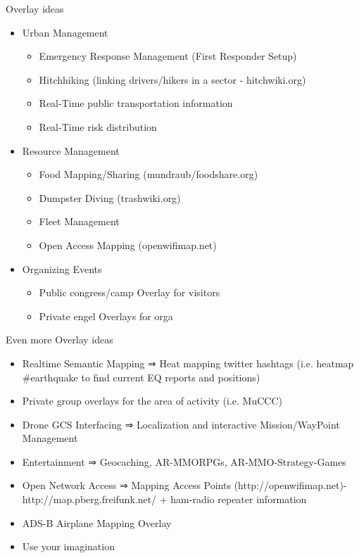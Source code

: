 \documentclass{beamer}
\begin{document}
\begin{frame}{Overlay ideas}{}
 \begin{itemize}
  \item Urban Management
   \begin{itemize}
    \item Emergency Response Management (First Responder Setup)
    \item Hitchhiking (linking drivers/hikers in a sector - hitchwiki.org)
    \item Real-Time public transportation information
    \item Real-Time risk distribution
   \end{itemize}
  \item Resource Management
   \begin{itemize}
    \item Food Mapping/Sharing (mundraub/foodshare.org)
    \item Dumpster Diving (trashwiki.org)
    \item Fleet Management
    \item Open Access Mapping (openwifimap.net)
   \end{itemize}
  \item Organizing Events
   \begin{itemize}
    \item Public congress/camp Overlay for visitors
    \item Private engel Overlays for orga
   \end{itemize}

 \end{itemize}
\end{frame}

\begin{frame}{Even more Overlay ideas}{}
 \vspace{1em}
 \begin{itemize}
  \item Realtime Semantic Mapping ⇒ Heat mapping twitter hashtags (i.e. heatmap \#earthquake to find current EQ reports and positions)
  \item Private group overlays for the area of activity (i.e. MuCCC)
  \item Drone GCS Interfacing ⇒ Localization and interactive Mission/WayPoint Management
  \item Entertainment ⇒ Geocaching, AR-MMORPGs, AR-MMO-Strategy-Games
  \item Open Network Access ⇒ Mapping Access Points (http://openwifimap.net)-http://map.pberg.freifunk.net/ + ham-radio repeater information
  \item ADS-B Airplane Mapping Overlay
  \item Use your imagination
 \end{itemize}
\end{frame}
\end{document}
